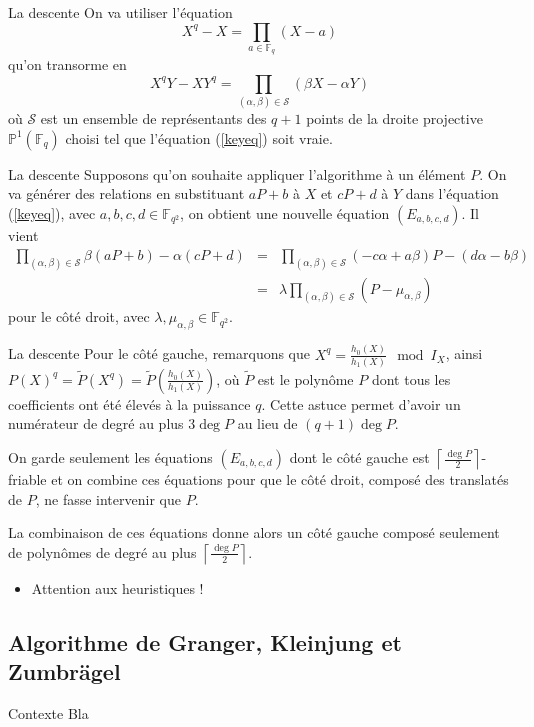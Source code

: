 \documentclass[xcolor=x11names,compress]{beamer}
\theoremstyle{break}
\theoremstyle{sc}
\theoremstyle{definition}
\theoremstyle{remark}
\begin{document}
\begin{frame}{La descente}
 On va utiliser l'équation 
 \[
   X^q - X = \prod_{a\in\mathbb{F}_q}(X-a)
 \]
 qu'on transorme en
 \begin{equation}
   X^qY - XY^q = \prod_{(\alpha, \beta)\in\mathcal S}(\beta X - \alpha Y)
   \label{keyeq}
 \end{equation}
 où $\mathcal S$ est un ensemble de représentants des $q+1$ points de la droite
 projective $\mathbb{P}^1(\mathbb{F}_q)$ choisi tel que l'équation
 (\ref{keyeq}) soit vraie.
\end{frame}

\begin{frame}{La descente}
  Supposons qu'on souhaite appliquer l'algorithme à un élément $P$. On va
  générer des relations en substituant $aP + b$ à $X$ et $cP + d$ à $Y$ dans l'équation
  (\ref{keyeq}), avec $a, b, c, d \in \mathbb{F}_{q^2}$, on obtient une nouvelle
  équation $(E_{a, b, c, d})$. Il vient 
  \begin{eqnarray*}
 \prod_{(\alpha, \beta)\in\mathcal S}\beta (aP + b) - \alpha (cP + d) &=&
 \prod_{(\alpha, \beta)\in\mathcal S}(-c\alpha + a\beta)P - (d\alpha - b\beta) \\
 &=& \lambda \prod_{(\alpha, \beta)\in\mathcal S}(P-\mu_{\alpha, \beta})
  \end{eqnarray*}
  pour le côté droit, avec $\lambda, \mu_{\alpha, \beta}\in\mathbb{F}_{q^2}$.
  
\end{frame}

\begin{frame}{La descente}
  Pour le côté gauche, remarquons que $X^q = \frac{h_0(X)}{h_1(X)} \mod I_X$,
  ainsi $P(X)^q = \tilde P(X^q) = \tilde P(\frac{h_0(X)}{h_1(X)})$, où $\tilde
  P$ est le
  polynôme $P$ dont tous les coefficients ont été élevés à la puissance $q$.
  Cette astuce permet d'avoir un numérateur de degré au plus $3\deg P$ au lieu
  de $(q+1)\deg P$.

  On garde seulement les équations $(E_{a, b, c, d})$ dont le côté gauche est
  $\left\lceil \frac{\deg P}{2}\right\rceil$-friable et on combine ces équations
  pour que le côté droit, composé des translatés de $P$, ne fasse intervenir que
  $P$.

  La combinaison de ces équations donne alors un côté gauche composé seulement
  de polynômes de degré au plus $\left\lceil \frac{\deg P}{2}\right\rceil$.
  \begin{itemize}
    \item Attention aux heuristiques !
  \end{itemize}
\end{frame}


\subsection{Algorithme de Granger, Kleinjung et Zumbrägel}

\begin{frame}{Contexte}
 Bla 
\end{frame}


\end{document}
